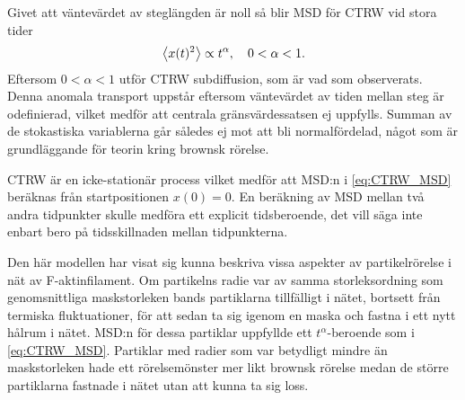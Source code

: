 Givet att väntevärdet av steglängden är noll så blir MSD för CTRW vid stora tider
\begin{equation}\label{eq:CTRW_MSD}
    \ev{x(t)^2} \propto t^{\alpha} \qcomma 0<\alpha<1.
\end{equation}
Eftersom $0<\alpha<1$ utför CTRW subdiffusion, som är vad som observerats. Denna anomala transport uppstår eftersom väntevärdet av tiden mellan steg är odefinierad, vilket medför att centrala gränsvärdessatsen ej uppfylls. Summan av de stokastiska variablerna går således ej mot att bli normalfördelad, något som är grundläggande för teorin kring brownsk rörelse.

CTRW är en icke-stationär process vilket medför att MSD:n i \eqref{eq:CTRW_MSD} beräknas från startpositionen $x(0)=0$. En beräkning av MSD mellan två andra tidpunkter skulle medföra ett explicit tidsberoende, det vill säga inte enbart bero på tidsskillnaden mellan tidpunkterna.


\begin{comment}
Positionsändringen och väntetiden beskrivs av två oberoende stokastiska variabler. 
MSD för denna typ av rörelse blir\cite{Barkai_MSDCTRW2007}
\begin{equation}
    \ev{x^2(t)} \approx \frac{\ev{\Delta x^2}}{A \Gamma(1+\alpha)}t^{\alpha} + \frac{2\ev{\Delta x}^2}{\Gamma(1+2\alpha)A^2} t^{2\alpha}, 
\end{equation}
där $A$ är en konstant som dyker upp i fördelningsfunktionen för väntetiderna, $\Gamma$ är gammafunktionen, $\alpha$ en konstant som uppfyller $0<\alpha<1$ och $\Delta x$ steget mellan två positioner. Om $\ev{\Delta x}=0 $ försvinner andra termen och rörelsens MSD blir proportionell mot $t^\alpha$. Eftersom $\alpha < 1$ blir MSD:n inte linjär i tiden, utan ändringstakten kommer att avta med tiden och rörelsen skiljer sig från den klassiska brownska rörelsen.
\end{comment}

Den här modellen har visat sig kunna beskriva vissa aspekter av partikelrörelse i nät av F-aktinfilament\cite{Barkai_CTRW}. Om partikelns radie var av samma storleksordning som genomsnittliga maskstorleken bands partiklarna tillfälligt i nätet, bortsett från termiska fluktuationer, för att sedan ta sig igenom en maska och fastna i ett nytt hålrum i nätet. MSD:n för dessa partiklar uppfyllde ett $t^{\alpha}$-beroende som i \eqref{eq:CTRW_MSD}. Partiklar med radier som var betydligt mindre än maskstorleken hade ett rörelsemönster mer likt brownsk rörelse medan de större partiklarna fastnade i nätet utan att kunna ta sig loss.

